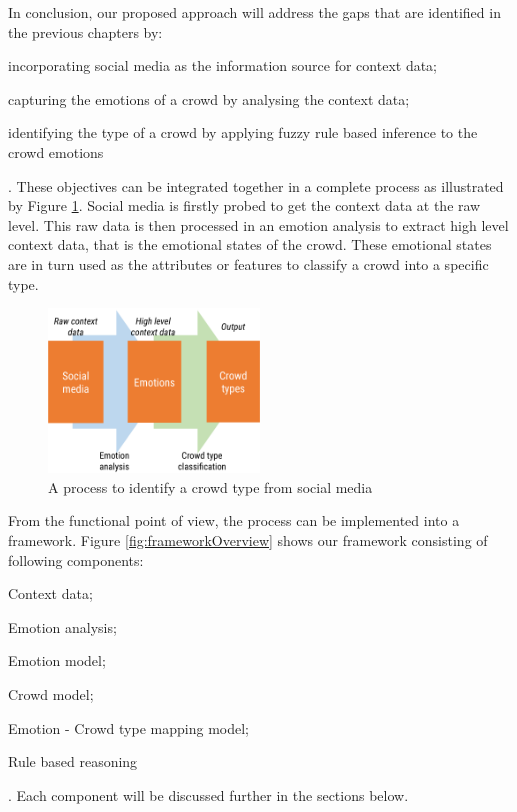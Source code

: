In conclusion, our proposed approach will address the gaps that are identified in the previous chapters by: 
\begin{inparaenum}[i)]
\item incorporating social media as the information source for context data;
\item capturing the emotions of a crowd by analysing the context data;
\item identifying the type of a crowd by applying fuzzy rule based inference to the crowd emotions
\end{inparaenum}. These objectives can be integrated together in a complete process as illustrated by Figure \ref{fig:processOverview}. Social media is firstly probed to get the context data at the raw level. This raw data is then processed in an emotion analysis to extract high level context data, that is the emotional states of the crowd. These emotional states are in turn used as the attributes or features to classify a crowd into a specific type.

\begin{figure}[htb!] 
\centering    
\includegraphics[width=0.5\textwidth]{ProcessOverview}
\caption{A process to identify a crowd type from social media}
\label{fig:processOverview}
\end{figure}

From the functional point of view, the process can be implemented into a framework. Figure \ref{fig:frameworkOverview} shows our framework consisting of following components:
\begin{inparaenum}[i)]
\item Context data;
\item Emotion analysis;
\item Emotion model;
\item Crowd model;
\item Emotion - Crowd type mapping model;
\item Rule based reasoning
\end{inparaenum}. Each component will be discussed further in the sections below.

